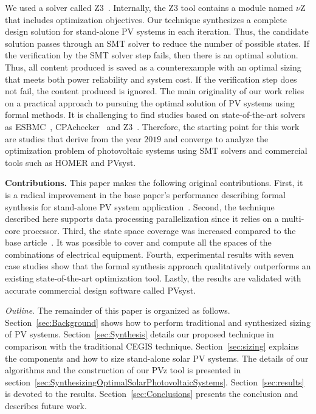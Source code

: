 \documentclass[review]{elsarticle}
\begin{document}
We used a solver called Z3~\citep{BjornerPF15}. Internally, the Z3 tool contains a module named $\nu$Z that includes optimization objectives. Our technique synthesizes a complete design solution for stand-alone PV systems in each iteration. Thus, the candidate solution passes through an SMT solver to reduce the number of possible states. If the verification by the SMT solver step fails, then there is an optimal solution. Thus, all content produced is saved as a counterexample with an optimal sizing that meets both power reliability and system cost. If the verification step does not fail, the content produced is ignored. The main originality of our work relies on a practical approach to pursuing the optimal solution of PV systems using formal methods. It is challenging to find studies based on state-of-the-art solvers as ESBMC~\citep{esbmc2018}, CPAchecker~\citep{Beyer2011} and Z3~\citep{BjornerPF15}. Therefore, the starting point for this work~\citep{VSTTE2020, TrindadeCordeiro19, AraujoBCF16} are studies that derive from the year $2019$ and converge to analyze the optimization problem of photovoltaic systems using SMT solvers and commercial tools such as HOMER and PVsyst. 

\noindent \textbf{Contributions.} This paper makes the following original contributions. First, it is a radical improvement in the base paper's performance describing formal synthesis for stand-alone PV system application~\citep{DBLP:journals/corr/abs-1909-13139}. Second, the technique described here supports data processing parallelization since it relies on a multi-core processor. Third, the state space coverage was increased compared to the base article~\citep{VSTTE2020}. It was possible to cover and compute all the spaces of the combinations of electrical equipment. Fourth, experimental results with seven case studies show that the formal synthesis approach qualitatively outperforms an existing state-of-the-art optimization tool. Lastly, the results are validated with accurate commercial design software called PVsyst.

\noindent \textit{Outline}. The remainder of this paper is organized as follows. Section~\ref{sec:Background} shows how to perform traditional and synthesized sizing of PV systems. Section~\ref{sec:Synthesis} details our proposed technique in comparison with the traditional CEGIS technique. Section~\ref{sec:sizing} explains the components and how to size stand-alone solar PV systems. The details of our algorithms and the construction of our PVz tool is presented in section~\ref{sec:SynthesizingOptimalSolarPhotovoltaicSystems}. Section~\ref{sec:results} is devoted to the results. Section~\ref{sec:Conclusions} presents the conclusion and describes future work.
\end{document}
